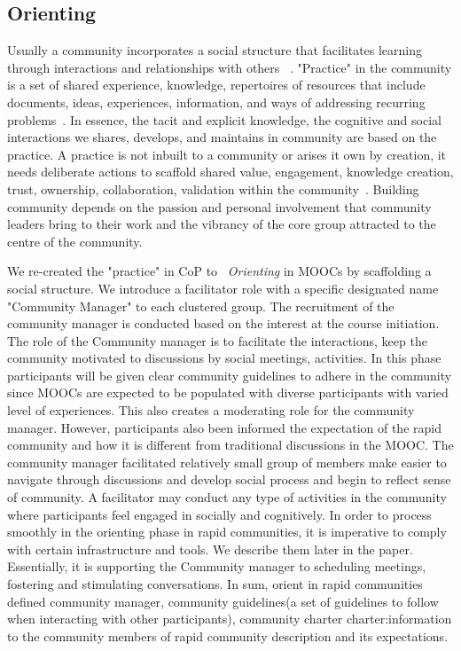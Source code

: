 \documentclass[manuscript,screen,review]{acmart}
\begin{document}
\subsection{Orienting} 
Usually a community incorporates a social structure that facilitates learning through interactions and relationships with others ~\cite{wenger2001harvard}. "Practice" in the community is a set of shared experience, knowledge, repertoires of resources that include documents, ideas, experiences, information, and ways of addressing recurring problems~\cite{wenger2001harvard}. In essence, the tacit and explicit knowledge, the cognitive and social interactions we shares, develops, and maintains in community are based on the practice. A practice is not inbuilt to a community or arises it own by creation, it needs deliberate actions to scaffold shared value, engagement, knowledge creation, trust, ownership, collaboration, validation within the community~\cite{liu2009community}. Building community depends on the passion and personal involvement that community leaders bring to their work and the vibrancy of the core group attracted to the centre of the community. 

We re-created the "practice" in CoP to ~\textit{Orienting} in MOOCs by scaffolding a social structure. We introduce a facilitator role with a specific designated name "Community Manager" to each clustered group. The recruitment of the community manager is conducted based on the interest at the course initiation. The role of the Community manager is to facilitate the interactions, keep the community motivated to discussions by social meetings, activities. In this phase participants will be given clear community guidelines to adhere in the community since MOOCs are expected to be populated with diverse participants with varied level of experiences. This also creates a moderating role for the community manager. However, participants also been informed the expectation of the rapid community and how it is different from traditional discussions in the MOOC. The community manager facilitated relatively small group of members make easier to navigate through discussions and develop social process and begin to reflect sense of community. A facilitator may conduct any type of activities in the community where participants feel engaged in socially and cognitively. In order to process smoothly in the orienting phase in rapid communities, it is imperative to comply with certain infrastructure and tools. We describe them later in the paper. Essentially, it is supporting the Community manager to scheduling meetings, fostering and stimulating conversations. In sum, orient in rapid communities defined community manager, community guidelines(a set of guidelines to follow when interacting with other participants), community charter charter:information to the community members of rapid community description and its expectations.
\end{document}
